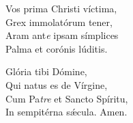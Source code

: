 Vos prima Christi víctima,\\
Grex immolatórum tener,\\
Aram ant\textit{e} ipsam símplices\\
Palma et corónis lúditis.

Glória tibi Dómine,\\
Qui natus es de Vírgine,\\
Cum Pa\tinyhspace\textit{tre} et Sancto Spíritu,\\
In sempitérna sǽcula.
Amen.